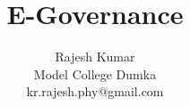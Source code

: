 \documentclass{beamer}
\begin{document}
\title{E-Governance}
\author{Rajesh Kumar \\Model College Dumka\\kr.rajesh.phy@gmail.com}
\date{}

\begin{frame}
  \titlepage
\end{frame}




\end{document}
